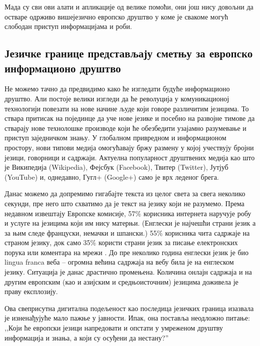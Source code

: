 \begin{multicols}{2}
Мада су сви ови алати и апликације од велике помоћи, они још нису довољни да остваре одрживо вишејезично европско друштво у коме је свакоме могућ слободан приступ информацијама и роби.
 
\subsection {Језичке границе представљају сметњу за европско информационо друштво}
  
Не можемо тачно да предвидимо како ће изгледати будуће информационо друштво. Али постоје велики изгледи да ће револуција у комуникационој технологији повезати на нове начине људе који говоре различитим језицима. То ствара притисак на појединце да уче нове језике и посебно на развојне тимове да стварају нове технолошке производе који ће обезбедити узајамно разумевање и приступ заједничком знању. У глобалном привредном и информационом простору, нови типови медија омогућавају бржу размену у којој учествују бројни језици, говорници и садржаји. Актуелна популарност друштвених медија као што је Википедија (Wikipedia), Фејсбук (Facebook), Твитер (Twitter), Јутјуб (YouTube) и, однедавно, Гугл+ (Google+) само је  врх леденог брега. 


Данас можемо да допремимо гигабајте текста из целог света за свега неколико секунди, пре него што схватимо да је текст на језику који не разумемо. Према недавном извештају Европске комисије, 57\% корисника интернета наручује робу и услуге на језицима који им нису матерњи. (Енглески је најчешћи страни језик а за њим следе француски, немачки и шпански.) 55\% корисника чита садржаје на страном језику, док само 35\% користи страни језик за писање електронских порука или коментара на мрежи \cite{EC1}. До пре неколико година енглески језик је био lingua franca веба -- огромна већина садржаја на вебу била је на енглеском језику.  Ситуација је данас драстично промењена. Количина онлајн садржаја и на другим европским (као и азијским и средњоисточним) језицима доживела је праву експлозију. 

Ова свеприсутна дигитална подељеност као последица језичких граница изазвала је изненађујуће мало пажње у јавности. Ипак, она поставља неодложно питање: ,,Који ће европски језици напредовати и опстати у умреженом друштву информација и знања, а који су осуђени да нестану?''
 

\end{multicols}
